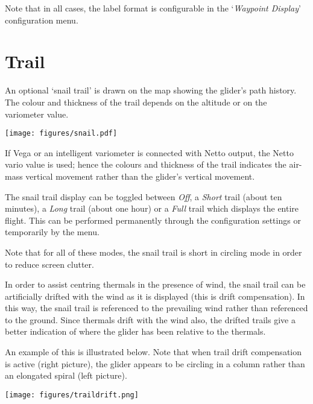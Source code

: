 Note that in all cases, the label format is configurable in the 
`\emph{Waypoint Display}' configuration menu.  


\section{Trail}\label{sec:trail}

An optional `snail trail' is drawn on the map showing the glider's
path history.  The colour and thickness of the trail depends on the altitude or
on the variometer value. 

\begin{center}
\texttt{[image: figures/snail.pdf]}
\end{center}

If Vega or an intelligent variometer is connected with Netto output,
the Netto vario value is used; hence the colours and thickness of the
trail indicates the air-mass vertical movement rather than the glider's
vertical movement.

The snail trail display can be toggled between \emph{Off}, a \emph{Short} trail
(about ten minutes), a \emph{Long} trail (about one hour) or a \emph{Full} trail
which displays the entire flight.  This can be performed permanently
through the configuration settings or temporarily by the
menu.

Note that for all of these modes, the snail trail is short in
circling mode in order to reduce screen clutter.

In order to assist centring thermals in the presence of wind, the
snail trail can be artificially drifted with the wind as it is
displayed (this is drift compensation).  In this way, the snail trail
is referenced to the prevailing wind rather than referenced to the
ground.  Since thermals drift with the wind also, the drifted trails
give a better indication of where the glider has been relative to the
thermals.

An example of this is illustrated below.  Note that when trail drift
compensation is active (right picture), the glider appears to be
circling in a column rather than an elongated spiral (left picture).

\begin{center}
\texttt{[image: figures/traildrift.png]}
\end{center}

